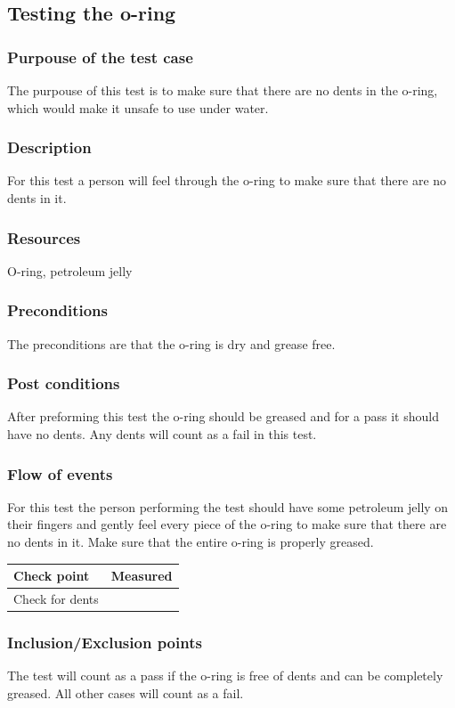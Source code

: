 \documentclass[10pt,a4paper]{article}
\begin{document}
\subsection{Testing the o-ring}
\label{oring}
\subsubsection*{Purpouse of the test case}
The purpouse of this test is to make sure that there are no dents in the o-ring, which would make it unsafe to use under water. 
\subsubsection*{Description}
For this test a person will feel through the o-ring to make sure that there are no dents in it. 
\subsubsection*{Resources}
O-ring, petroleum jelly
\subsubsection*{Preconditions}
The preconditions are that the o-ring is dry and grease free. 
\subsubsection*{Post conditions}
After preforming this test the o-ring should be greased and for a pass it should have no dents. Any dents will count as a fail in this test. 
\subsubsection*{Flow of events}
For this test the person performing the test should have some petroleum jelly on their fingers and gently feel every piece of the o-ring to make sure that there are no dents in it. Make sure that the entire o-ring is properly greased. 
\begin{tabular}{| l | c |}
\hline
Check point & Measured \\ \hline
Check for dents &  \\ \hline
\end{tabular}
\subsubsection*{Inclusion/Exclusion points}
The test will count as a pass if the o-ring is free of dents and can be completely greased. All other cases will count as a fail. 
\end{document}
